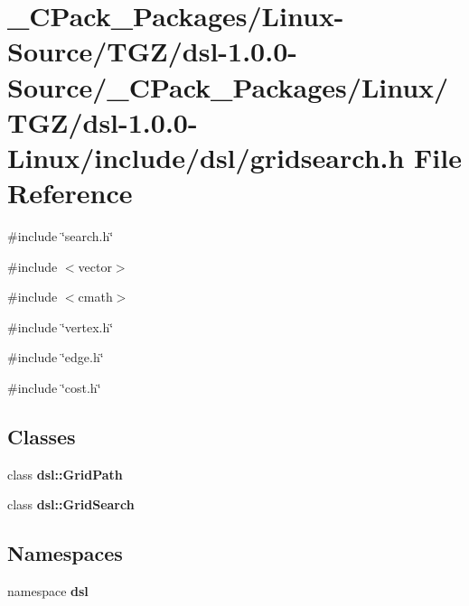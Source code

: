 \section{\_\-CPack\_\-Packages/Linux-\/Source/TGZ/dsl-\/1.0.0-\/Source/\_\-CPack\_\-Packages/Linux/TGZ/dsl-\/1.0.0-\/Linux/include/dsl/gridsearch.h File Reference}
\label{__CPack__Packages_2Linux-Source_2TGZ_2dsl-1_80_80-Source_2__CPack__Packages_2Linux_2TGZ_2dsl-1_8f5a69461b6dba9bf82de7d8bcacd6d50}
{\ttfamily \#include \char`\"{}search.h\char`\"{}}\par
{\ttfamily \#include $<$vector$>$}\par
{\ttfamily \#include $<$cmath$>$}\par
{\ttfamily \#include \char`\"{}vertex.h\char`\"{}}\par
{\ttfamily \#include \char`\"{}edge.h\char`\"{}}\par
{\ttfamily \#include \char`\"{}cost.h\char`\"{}}\par
\subsection*{Classes}
\begin{DoxyCompactItemize}
\item 
class {\bf dsl::GridPath}
\item 
class {\bf dsl::GridSearch}
\end{DoxyCompactItemize}
\subsection*{Namespaces}
\begin{DoxyCompactItemize}
\item 
namespace {\bf dsl}
\end{DoxyCompactItemize}
